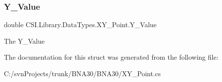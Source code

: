 \subsubsection{\texorpdfstring{Y\_Value}{Y\_Value}}
{\footnotesize\ttfamily double C\+S\+I.\+Library.\+Data\+Types.\+X\+Y\+\_\+\+Point.\+Y\+\_\+\+Value}



The Y\+\_\+\+Value 



The documentation for this struct was generated from the following file\+:\begin{DoxyCompactItemize}
\item 
C\+:/svn\+Projects/trunk/\+B\+N\+A30/\+B\+N\+A30/X\+Y\+\_\+\+Point.\+cs\end{DoxyCompactItemize}
